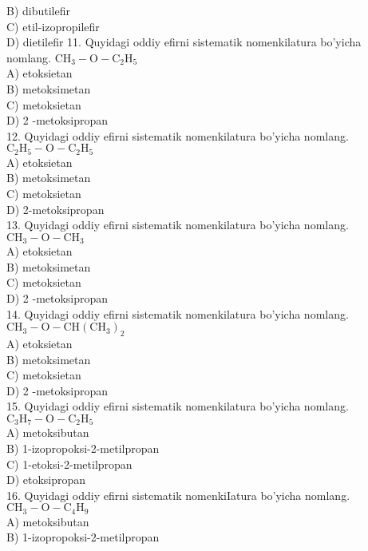 B) dibutilefir\\
C) etil-izopropilefir\\
D) dietilefir
11. Quyidagi oddiy efirni sistematik nomenkilatura bo'yicha nomlang. $\mathrm{CH}_{3}-\mathrm{O}-\mathrm{C}_{2} \mathrm{H}_{5}$\\
A) etoksietan\\
B) metoksimetan\\
C) metoksietan\\
D) 2 -metoksipropan\\
12. Quyidagi oddiy efirni sistematik nomenkilatura bo'yicha nomlang.\\
$\mathrm{C}_{2} \mathrm{H}_{5}-\mathrm{O}-\mathrm{C}_{2} \mathrm{H}_{5}$\\
A) etoksietan\\
B) metoksimetan\\
C) metoksietan\\
D) 2-metoksipropan\\
13. Quyidagi oddiy efirni sistematik nomenkilatura bo'yicha nomlang. $\mathrm{CH}_{3}-\mathrm{O}-\mathrm{CH}_{3}$\\
A) etoksietan\\
B) metoksimetan\\
C) metoksietan\\
D) 2 -metoksipropan\\
14. Quyidagi oddiy efirni sistematik nomenkilatura bo'yicha nomlang. $\mathrm{CH}_{3}-\mathrm{O}-\mathrm{CH}\left(\mathrm{CH}_{3}\right)_{2}$\\
A) etoksietan\\
B) metoksimetan\\
C) metoksietan\\
D) 2 -metoksipropan\\
15. Quyidagi oddiy efirni sistematik nomenkilatura bo'yicha nomlang.\\
$\mathrm{C}_{3} \mathrm{H}_{7}-\mathrm{O}-\mathrm{C}_{2} \mathrm{H}_{5}$\\
A) metoksibutan\\
B) 1-izopropoksi-2-metilpropan\\
C) 1-etoksi-2-metilpropan\\
D) etoksipropan\\
16. Quyidagi oddiy efirni sistematik nomenkiIatura bo'yicha nomlang.\\
$\mathrm{CH}_{3}-\mathrm{O}-\mathrm{C}_{4} \mathrm{H}_{9}$\\
A) metoksibutan\\
B) 1-izopropoksi-2-metilpropan\\
